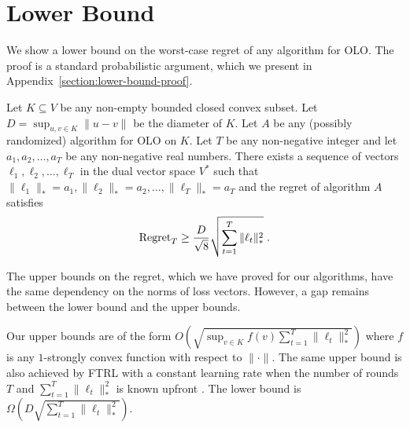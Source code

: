 \section{Lower Bound}
\label{section:lower-bound}

We show a lower bound on the worst-case regret of any algorithm for OLO. The
proof is a standard probabilistic argument, which we present in
Appendix~\ref{section:lower-bound-proof}.

\begin{theorem}
\label{theorem:simple-lower-bound}
Let $K \subseteq V$ be any non-empty bounded closed convex subset. Let $D =
\sup_{u,v \in K} \|u - v\|$ be the diameter of $K$. Let $A$ be any (possibly
randomized) algorithm for OLO on $K$. Let $T$ be any non-negative integer and
let $a_1, a_2, \dots, a_T$ be any non-negative real numbers.  There exists a
sequence of vectors $\ell_1, \ell_2, \dots, \ell_T$ in the dual vector space
$V^*$ such that $\|\ell_1\|_* = a_1, \|\ell_2\|_* = a_2, \dots, \|\ell_T\|_* =
a_T$ and the regret of algorithm $A$ satisfies
\begin{equation}
\label{equation:simple-lower-bound}
\operatorname{Regret}_T \ge \frac{D}{\sqrt{8}} \sqrt{\sum_{t=1}^T\|\ell_t\|_*^2} \; .
\end{equation}
\end{theorem}

The upper bounds on the regret, which we have proved for our algorithms, have
the same dependency on the norms of loss vectors.  However, a gap remains
between the lower bound and the upper bounds.

Our upper bounds are of the form $O(\sqrt{\sup_{v \in K} f(v) \sum_{t=1}^T
\|\ell_t\|_*^2})$ where $f$ is any $1$-strongly convex function with respect to
$\|\cdot\|$.  The same upper bound is also achieved by FTRL with a constant
learning rate when the number of rounds $T$ and $\sum_{t=1}^T \|\ell_t\|_*^2$
is known upfront \cite[Chapter 2]{Shalev-Shwartz-2011}.  The lower bound is
$\Omega(D\sqrt{\sum_{t=1}^T \|\ell_t\|_*^2})$.

